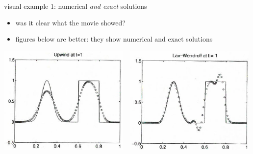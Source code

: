 \documentclass[10pt,dvipsnames,usepdftitle=false,
hyperref={pdftitle = {Finite volume methods},
    pdfauthor = {Ed Bueler}}]{beamer}
\begin{document}
\begin{frame}{visual example 1: numerical \emph{and exact} solutions}

\begin{itemize}
\item was it clear what the movie showed?
\item figures below are better: they show numerical and exact solutions
\end{itemize}

\bigskip
\hfill \mbox{\includegraphics[width=0.48\textwidth]{figs/leveque6p1upwind} \, \includegraphics[width=0.48\textwidth]{figs/leveque6p1lw}}
\end{frame}
\end{document}

